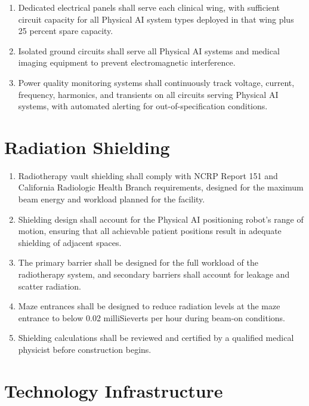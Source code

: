 \documentclass[11pt,letterpaper]{article}
\begin{document}
\begin{enumerate}[label=(\alph*)]
\item Dedicated electrical panels shall serve each clinical wing, with
  sufficient circuit capacity for all Physical AI system types deployed in
  that wing plus 25 percent spare capacity.

\item Isolated ground circuits shall serve all Physical AI systems and medical
  imaging equipment to prevent electromagnetic interference.

\item Power quality monitoring systems shall continuously track voltage, current,
  frequency, harmonics, and transients on all circuits serving Physical AI
  systems, with automated alerting for out-of-specification conditions.
\end{enumerate}

\section{Radiation Shielding}

\begin{enumerate}[label=(\alph*)]
\item Radiotherapy vault shielding shall comply with NCRP Report 151 and
  California Radiologic Health Branch requirements, designed for the maximum
  beam energy and workload planned for the facility.

\item Shielding design shall account for the Physical AI positioning robot's
  range of motion, ensuring that all achievable patient positions result in
  adequate shielding of adjacent spaces.

\item The primary barrier shall be designed for the full workload of the
  radiotherapy system, and secondary barriers shall account for leakage and
  scatter radiation.

\item Maze entrances shall be designed to reduce radiation levels at the maze
  entrance to below 0.02 milliSieverts per hour during beam-on conditions.

\item Shielding calculations shall be reviewed and certified by a qualified
  medical physicist before construction begins.
\end{enumerate}

\section{Technology Infrastructure}
\end{document}
